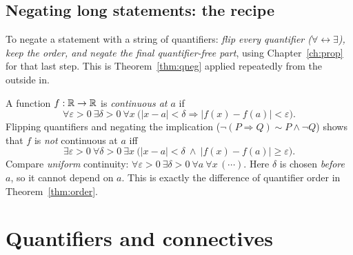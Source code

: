 \subsection*{Negating long statements: the recipe}

To negate a statement with a string of quantifiers: \emph{flip every quantifier ($\forall\leftrightarrow\exists$), keep the order, and negate the final quantifier-free part}, using Chapter~\ref{ch:prop} for that last step. This is Theorem~\ref{thm:qneg} applied repeatedly from the outside in.

\begin{example}\label{ex:eps-delta-neg}
	A function $f:\mathbb{R}\to\mathbb{R}$ is \emph{continuous at $a$} if
	\[
	\forall\varepsilon>0\ \exists\delta>0\ \forall x\ \bigl(|x-a|<\delta\Rightarrow|f(x)-f(a)|<\varepsilon\bigr).
	\]
	Flipping quantifiers and negating the implication ($\neg(P\Rightarrow Q)\sim P\wedge\neg Q$) shows that $f$ is \emph{not} continuous at $a$ iff
	\[
	\exists\varepsilon>0\ \forall\delta>0\ \exists x\ \bigl(|x-a|<\delta\ \wedge\ |f(x)-f(a)|\ge\varepsilon\bigr).
	\]
	Compare \emph{uniform} continuity: $\forall\varepsilon>0\ \exists\delta>0\ \forall a\ \forall x\,(\cdots)$. Here $\delta$ is chosen \emph{before} $a$, so it cannot depend on $a$. This is exactly the difference of quantifier order in Theorem~\ref{thm:order}.
\end{example}

\section{Quantifiers and connectives}


